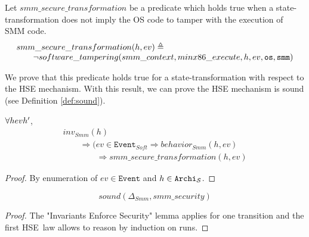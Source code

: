                                        Let $smm\_secure\_transformation$ be a
                                       predicate which holds true when a
                                       state-transformation does not imply the
                                       OS code to tamper with the execution of
                                       SMM code.
                                       \[ \begin{array}{l}
                                            smm\_secure\_transformation(h, ev) \triangleq \\
                                            \qquad \neg
                                            software\_tampering(smm\_context,
                                            minx86\_execute, h, ev, \mathtt{os},
                                            \mathtt{smm})
                                          \end{array} \]

                                        We prove that this predicate holds true
                                        for a state-transformation with respect
                                        to the HSE mechanism. With this result,
                                        we can prove the HSE mechanism is sound
                                        (see Definition \ref{def:sound}).

\begin{lemma}
  $\forall \transitionLTS{Smmx86}{h}{ev}{h'}$,
  \[ \begin{array}{l}
       inv_{Smm}(h) \\
       \qquad \Rightarrow (ev \in \texttt{Event}_{Soft} \Rightarrow
       behavior_{Smm}(h,ev) \\
       \qquad\qquad \Rightarrow smm\_secure\_transformation(h, ev)
     \end{array} \]

  \begin{proof}
    By enumeration of $ev \in \texttt{Event}$ and
    $h \in \texttt{Archi}_{\mathcal{S}}$.
  \end{proof}
 \end{lemma}

\begin{theorem}
  \[ sound(\Delta_{Smm}, smm\_security) \]
  \begin{proof}
    The "Invariants Enforce Security" lemma applies for one transition and the
    first HSE law allows to reason by induction on runs.
  \end{proof}
\end{theorem}


